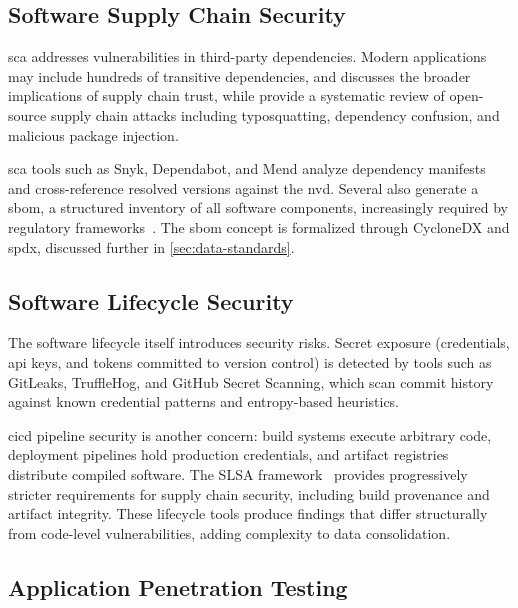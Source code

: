 
\subsection{Software Supply Chain Security}
\label{sec:supply-chain-security}

\Gls{sca} addresses vulnerabilities in third-party dependencies. Modern applications may include hundreds of transitive dependencies, and \textcite{Anderson2020} discusses the broader implications of supply chain trust, while \textcite{Ohm2020} provide a systematic review of open-source supply chain attacks including typosquatting, dependency confusion, and malicious package injection.

\gls{sca} tools such as Snyk, Dependabot, and Mend analyze dependency manifests and cross-reference resolved versions against the \gls{nvd}. Several also generate a \gls{sbom}, a structured inventory of all software components, increasingly required by regulatory frameworks~\parencite{NTIA2021}. The \gls{sbom} concept is formalized through CycloneDX and \gls{spdx}, discussed further in \autoref{sec:data-standards}.


\subsection{Software Lifecycle Security}
\label{sec:lifecycle-security}

The software lifecycle itself introduces security risks. Secret exposure (credentials, \gls{api} keys, and tokens committed to version control) is detected by tools such as GitLeaks, TruffleHog, and GitHub Secret Scanning, which scan commit history against known credential patterns and entropy-based heuristics.

\gls{cicd} pipeline security is another concern: build systems execute arbitrary code, deployment pipelines hold production credentials, and artifact registries distribute compiled software. The SLSA framework~\parencite{SLSA2024} provides progressively stricter requirements for supply chain security, including build provenance and artifact integrity. These lifecycle tools produce findings that differ structurally from code-level vulnerabilities, adding complexity to data consolidation.


\subsection{Application Penetration Testing}
\label{sec:penetration-testing}

